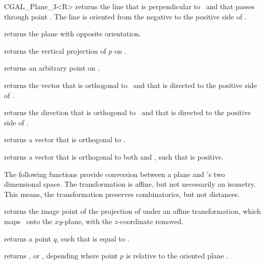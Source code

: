 \begin {classtemplate} {CGAL_Plane_3<R>}
       {returns the line that is perpendicular to \var\ and that
        passes through point . The line is oriented from
        the negative to the positive side of \var.}

       {returns the plane with opposite orientation.}

       {returns the vertical projection of $p$ on \var.}

       {returns an arbitrary point on \var.}

       {returns the vector that is orthogonal to \var\ and that
        is directed to the positive side of \var.}

       {returns the direction that is orthogonal to \var\ and that
        is directed to the positive side of \var.}

       {returns a vector that is orthogonal to 
        .}

       {returns a vector that is orthogonal to both 
         and , 
         such that 
         is positive.}

The following functions provide conversion between a plane and 
\cgal's two dimensional space. The transformation is affine, but
not necessarily an isometry. This means, the transformation preserves
combinatorics, but not distances.



       {returns the image point of the projection of  
       under an affine transformation, which maps \var\ onto the 
       $xy$-plane, with the $z$-coordinate removed.}

       {returns a point $q$, such that 
        is equal to .}


       {returns , 
         or ,
        depending where point $p$ is relative to the oriented plane \var.
        }




\end{classtemplate}
